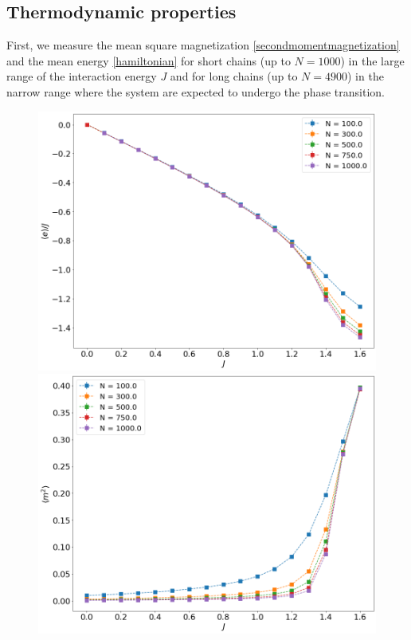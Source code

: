 \subsection{Thermodynamic properties}
First, we measure the mean square magnetization \eqref{secondmomentmagnetization} and the mean energy \eqref{hamiltonian} for short chains (up to $N=1000$) in the large range of the interaction energy $J$ and for long chains (up to $N=4900$) in the narrow range where the system are expected to undergo the phase transition.

 \begin{figure}[t]
	\centering
	\includegraphics[scale=0.23]{Images/energy_shortchains.png}
	\includegraphics[scale=0.23]{Images/magnetization2_shortchains.png} \\

\end{figure}
